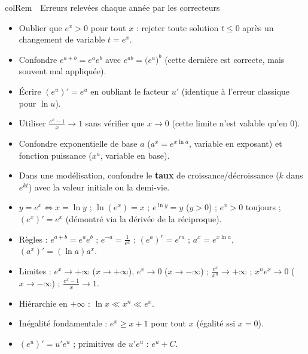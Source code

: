 \documentclass[11pt,a4paper]{article}
\newenvironment{remarque}[1][Remarque]
  {\begin{fiche}{colRem}{\ding{43}~~#1}}{\end{fiche}}
\begin{document}
\begin{remarque}[Erreurs relevées chaque année par les correcteurs]
\begin{itemize}[leftmargin=6mm, itemsep=0.5mm]
  \item Oublier que $e^x>0$ pour tout $x$ : rejeter toute solution $t\leq0$ après un changement de variable $t=e^x$.
  \item Confondre $e^{a+b}=e^ae^b$ avec $e^{ab}=\bigl(e^a\bigr)^b$ (cette dernière est correcte, mais souvent mal appliquée).
  \item Écrire $\left(e^{u}\right)'=e^{u}$ en oubliant le facteur $u'$ (identique à l'erreur classique pour $\ln u$).
  \item Utiliser $\frac{e^x-1}{x}\to1$ sans vérifier que $x\to0$ (cette limite n'est valable qu'en $0$).
  \item Confondre exponentielle de base $a$ ($a^x=e^{x\ln a}$, variable en exposant) et fonction puissance ($x^a$, variable en base).
  \item Dans une modélisation, confondre le \textbf{taux} de croissance/décroissance ($k$ dans $e^{kt}$) avec la valeur initiale ou la demi-vie.
\end{itemize}
\end{remarque}

\vspace{4mm}
\begin{tcolorbox}[
  enhanced, boxrule=0pt, arc=2mm,
  interior style={left color=qtealdark, right color=qteal},
  left=6mm, right=6mm, top=4mm, bottom=4mm,
  fontupper=\color{white}\sffamily,
  title={\sffamily\bfseries\color{white}\ding{72}~~À retenir},
  colbacktitle=qtealdark, coltitle=white, boxrule=0pt
]
\begin{itemize}[leftmargin=6mm, label={\color{qamber}}, itemsep=1mm]
  \item $y=e^x\iff x=\ln y$ ; $\ln(e^x)=x$ ; $e^{\ln y}=y$ ($y>0$) ; $e^x>0$ toujours ; $(e^x)'=e^x$ (démontré via la dérivée de la réciproque).
  \item Règles : $e^{a+b}=e^ae^b$ ; $e^{-a}=\frac1{e^a}$ ; $(e^a)^r=e^{ra}$ ; $a^x=e^{x\ln a}$, $(a^x)'=(\ln a)a^x$.
  \item Limites : $e^x\to+\infty$ ($x\to+\infty$), $e^x\to0$ ($x\to-\infty$) ; $\frac{e^x}{x^n}\to+\infty$ ; $x^ne^x\to0$ ($x\to-\infty$) ; $\frac{e^x-1}{x}\to1$.
  \item Hiérarchie en $+\infty$ : $\ln x\ll x^n\ll e^x$.
  \item Inégalité fondamentale : $e^x\geq x+1$ pour tout $x$ (égalité ssi $x=0$).
  \item $(e^u)'=u'e^u$ ; primitives de $u'e^u$ : $e^u+C$.
\end{itemize}
\end{tcolorbox}
\end{document}
